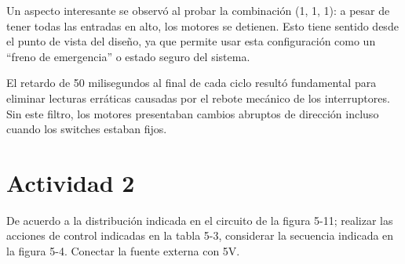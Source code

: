 \documentclass[letterpaper,12pt]{article}
\begin{document}
    Un aspecto interesante se observó al probar la combinación (1, 1, 1): a pesar de tener todas las entradas en alto, los motores se detienen. Esto tiene sentido desde el punto de vista del diseño, ya que permite usar esta configuración como un ``freno de emergencia'' o estado seguro del sistema.

    El retardo de 50 milisegundos al final de cada ciclo resultó fundamental para eliminar lecturas erráticas causadas por el rebote mecánico de los interruptores. Sin este filtro, los motores presentaban cambios abruptos de dirección incluso cuando los switches estaban fijos.

    \vspace{2.6cm}
    \section*{Actividad 2}

    De acuerdo a la distribución indicada en el circuito de la figura 5-11; realizar las acciones
    de control indicadas en la tabla 5-3, considerar la secuencia indicada en la figura 5-4. Conectar la
    fuente externa con 5V.
\end{document}
